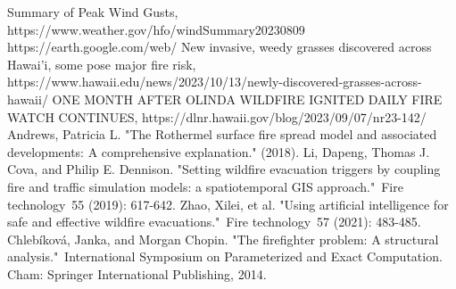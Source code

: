 \documentclass[12pt]{article}  %
\begin{document}
\clearpage   
\begin{thebibliography}{99}
     Summary of Peak Wind Gusts,  https://www.weather.gov/hfo/windSummary20230809
     https://earth.google.com/web/
     New invasive, weedy grasses discovered across Hawai'i, some pose major fire risk,  https://www.hawaii.edu/news/2023/10/13/newly-discovered-grasses-across-hawaii/
     ONE MONTH AFTER OLINDA WILDFIRE IGNITED DAILY FIRE WATCH CONTINUES,  https://dlnr.hawaii.gov/blog/2023/09/07/nr23-142/
     Andrews, Patricia L. "The Rothermel surface fire spread model and associated developments: A comprehensive explanation." (2018).
	 Li, Dapeng, Thomas J. Cova, and Philip E. Dennison. "Setting wildfire evacuation triggers by coupling fire and traffic simulation models: a spatiotemporal GIS approach." Fire technology 55 (2019): 617-642.
	 Zhao, Xilei, et al. "Using artificial intelligence for safe and effective wildfire evacuations." Fire technology 57 (2021): 483-485.
	 Chlebíková, Janka, and Morgan Chopin. "The firefighter problem: A structural analysis." International Symposium on Parameterized and Exact Computation. Cham: Springer International Publishing, 2014.


\end{thebibliography}
%  
\end{document}
